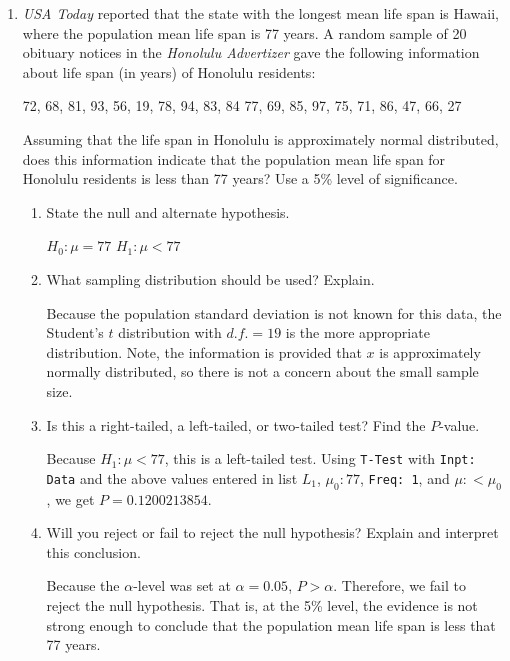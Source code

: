 \documentclass{article}
\newcommand{\answer}[1]{\color{red}#1}
\begin{document}
\begin{enumerate}
\begin{enumerate}
	\end{enumerate}


\item {\em USA Today} reported that the state with the longest mean life span is Hawaii, where the population mean life span is 77 years. A random sample of 20 obituary notices in the {\em Honolulu Advertizer} gave the following information about life span (in years) of Honolulu residents:
	\begin{center}
	72, 68, 81, 93, 56, 19, 78, 94, 83, 84  
	77, 69, 85, 97, 75, 71, 86, 47, 66, 27 
	\end{center}
Assuming that the life span in Honolulu is approximately normal distributed, does this information indicate that the population mean life span for Honolulu residents is less than 77 years? Use a 5\% level of significance.
	\begin{enumerate}
	\item State the null and alternate hypothesis.  
	
	{\answer $H_0 : \mu = 77$  
	$H_1: \mu < 77$}  
	
	\item What sampling distribution should be used? Explain.  
	
	{\answer Because the population standard deviation is not known for this data, the Student's $t$ distribution with $d.f.= 19$ is the more appropriate distribution. Note, the information is provided that $x$ is approximately normally distributed, so there is not a concern about the small sample size.}  
	
	\item Is this a right-tailed, a left-tailed, or two-tailed test? Find the $P$-value.  
	
	{\answer Because $H_1: \mu < 77$, this is a left-tailed test.  
	Using \texttt{T-Test} with \texttt{Inpt: Data} and the above values entered in list $L_1$, $\mu_0: 77$, \texttt{Freq: 1}, and $\mu: < \mu_0$, we get $P = 0.1200213854$.}  
	
	\item Will you reject or fail to reject the null hypothesis? Explain and interpret this conclusion.  
	
	{\answer Because the $\alpha$-level was set at $\alpha = 0.05$, $P > \alpha$. Therefore, we fail to reject the null hypothesis. That is, at the 5\% level, the evidence is not strong enough to conclude that the population mean life span is less that 77 years.}  
	
	\end{enumerate}


\end{enumerate}
\end{document}
